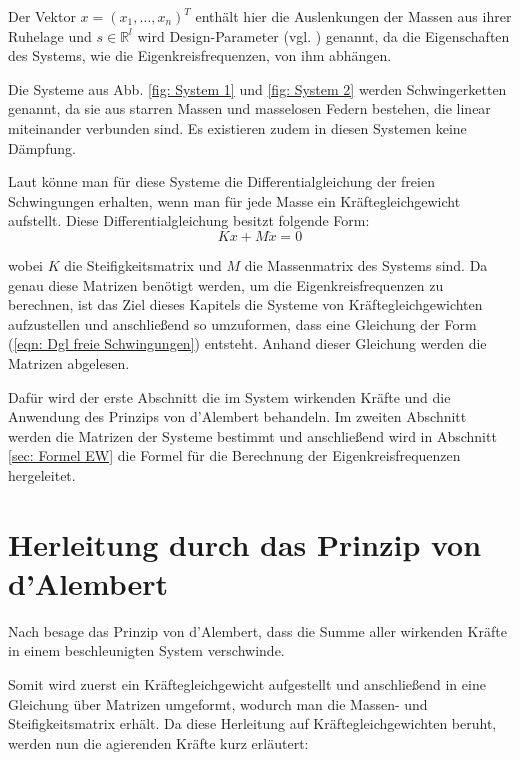 \documentclass[a4paper,12pt]{report}
\newcommand{\R}{\mathbb R}
\newcommand{\zitat}[1]{\glqq #1\grqq}
\newcommand{\1}{\mathds{1}}
\theoremstyle{plain} %
\theoremstyle{definition} %
\theoremstyle{remark}
\begin{document}
      Der Vektor $x = (x_1,\dots,x_n)^T$ enthält hier die Auslenkungen der Massen aus ihrer Ruhelage und $s\in\R^l$ wird Design-Parameter (vgl. \cite[S. 2]{hauptteilTkachuk}) genannt, da die Eigenschaften des Systems, wie die Eigenkreisfrequenzen, von ihm abhängen.

      Die Systeme aus Abb. \ref{fig: System 1} und \ref{fig: System 2} werden \zitat{Schwingerketten}\cite[S. 236]{maschinendynamikDresig} genannt, da sie aus starren Massen und masselosen Federn bestehen, die linear miteinander verbunden sind.
      Es existieren zudem in diesen Systemen keine Dämpfung.
      
      Laut \cite[S. 362-365]{maschinendynamikDresig} könne man für diese Systeme die \zitat{Differentialgleichung der freien Schwingungen}\cite[S. 365]{maschinendynamikDresig} erhalten, wenn man für jede Masse ein Kräftegleichgewicht aufstellt.
      Diese Differentialgleichung besitzt folgende Form:
      \begin{equation}
            \label{eqn: Dgl freie Schwingungen}
            Kx+M\ddot x = 0
      \end{equation}

      wobei $K$ die Steifigkeitsmatrix und $M$ die Massenmatrix des Systems sind.
      Da genau diese Matrizen benötigt werden, um die Eigenkreisfrequenzen zu berechnen, ist das Ziel dieses Kapitels die Systeme von Kräftegleichgewichten aufzustellen und anschließend so umzuformen, dass eine Gleichung der Form (\ref{eqn: Dgl freie Schwingungen}) entsteht.
      Anhand dieser Gleichung werden die Matrizen abgelesen.

      Dafür wird der erste Abschnitt die im System wirkenden Kräfte und die Anwendung des Prinzips von d'Alembert behandeln.
      Im zweiten Abschnitt werden die Matrizen der Systeme bestimmt und anschließend wird in Abschnitt \ref{sec: Formel EW} die Formel für die Berechnung der Eigenkreisfrequenzen hergeleitet. 
      
      \section{Herleitung durch das Prinzip von d'Alembert}
            Nach \cite{d_AlembertPrinzip} besage das Prinzip von d'Alembert, dass die Summe aller wirkenden Kräfte in einem beschleunigten System verschwinde.

            Somit wird zuerst ein Kräftegleichgewicht aufgestellt und anschließend in eine Gleichung über Matrizen umgeformt, wodurch man die Massen- und Steifigkeitsmatrix erhält.
            Da diese Herleitung auf Kräftegleichgewichten beruht, werden nun die agierenden Kräfte kurz erläutert:
\end{document}
